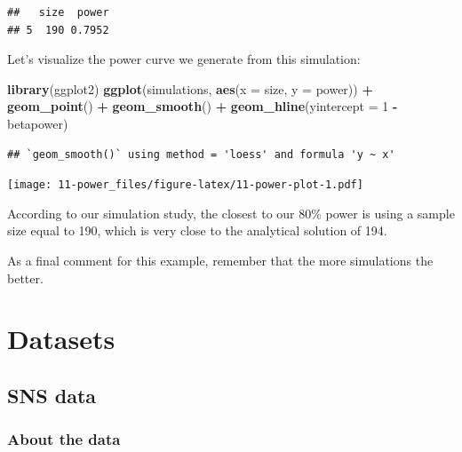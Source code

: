 \documentclass[]{book}
\newenvironment{Shaded}{\begin{snugshade}}{\end{snugshade}}
\newcommand{\DataTypeTok}[1]{\textcolor[rgb]{0.13,0.29,0.53}{#1}}
\newcommand{\DecValTok}[1]{\textcolor[rgb]{0.00,0.00,0.81}{#1}}
\newcommand{\KeywordTok}[1]{\textcolor[rgb]{0.13,0.29,0.53}{\textbf{#1}}}
\newcommand{\NormalTok}[1]{#1}
\newcommand{\OperatorTok}[1]{\textcolor[rgb]{0.81,0.36,0.00}{\textbf{#1}}}
\newcommand{\StringTok}[1]{\textcolor[rgb]{0.31,0.60,0.02}{#1}}
\begin{document}
\begin{verbatim}
##   size  power
## 5  190 0.7952
\end{verbatim}

Let's visualize the power curve we generate from this simulation:

\begin{Shaded}
\begin{Highlighting}[]
\KeywordTok{library}\NormalTok{(ggplot2)}
\KeywordTok{ggplot}\NormalTok{(simulations, }\KeywordTok{aes}\NormalTok{(}\DataTypeTok{x =}\NormalTok{ size, }\DataTypeTok{y =}\NormalTok{ power)) }\OperatorTok{+}
\StringTok{    }\KeywordTok{geom_point}\NormalTok{() }\OperatorTok{+}
\StringTok{    }\KeywordTok{geom_smooth}\NormalTok{() }\OperatorTok{+}
\StringTok{    }\KeywordTok{geom_hline}\NormalTok{(}\DataTypeTok{yintercept =} \DecValTok{1} \OperatorTok{-}\StringTok{ }\NormalTok{betapower)}
\end{Highlighting}
\end{Shaded}

\begin{verbatim}
## `geom_smooth()` using method = 'loess' and formula 'y ~ x'
\end{verbatim}

\texttt{[image: 11-power\_files/figure-latex/11-power-plot-1.pdf]}

According to our simulation study, the closest to our 80\% power is using a sample size equal to 190, which is very close to the analytical solution of 194.

As a final comment for this example, remember that the more simulations the better.

\cleardoublepage

\hypertarget{appendix-appendix}{%
\appendix}


\hypertarget{datasets-1}{%
\chapter{Datasets}\label{datasets-1}}

\hypertarget{sns-data}{%
\section{SNS data}\label{sns-data}}

\hypertarget{about-the-data}{%
\subsection{About the data}\label{about-the-data}}
\end{document}
